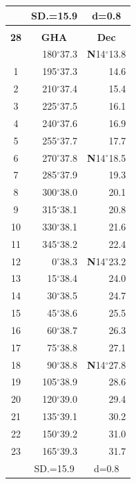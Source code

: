 \documentclass[10pt, a4paper]{report}
\begin{document}
\begin{scriptsize}
\begin{tabular*}{0.2\textwidth}[t]{@{\extracolsep{\fill}}|c|rr|}
\hline
\rule{0pt}{2.4ex} & \multicolumn{1}{c}{SD.=15.9} & \multicolumn{1}{c|}{d=0.8}\\
\hline
\multicolumn{1}{c}{}\\[-0.5ex]\hline
\multicolumn{1}{|c|}{\rule{0pt}{2.6ex}\textbf{28}} & \multicolumn{1}{c}{\textbf{GHA}} & \multicolumn{1}{c|}{\textbf{Dec}}\\
\hline\rule{0pt}{2.6ex}\noindent
0 & 180$^\circ$37.3 & \textbf{N}14$^\circ$13.8\\
1 & 195$^\circ$37.3 & 14.6\\
2 & 210$^\circ$37.4 & 15.4\\
3 & 225$^\circ$37.5 & \raisebox{0.24ex}{\boldmath$\cdot$~\boldmath$\cdot$~~}16.1\\
4 & 240$^\circ$37.6 & 16.9\\
5 & 255$^\circ$37.7 & 17.7\\[2Pt]
6 & 270$^\circ$37.8 & \textbf{N}14$^\circ$18.5\\
7 & 285$^\circ$37.9 & 19.3\\
8 & 300$^\circ$38.0 & 20.1\\
9 & 315$^\circ$38.1 & \raisebox{0.24ex}{\boldmath$\cdot$~\boldmath$\cdot$~~}20.8\\
10 & 330$^\circ$38.1 & 21.6\\
11 & 345$^\circ$38.2 & 22.4\\[2Pt]
12 & 0$^\circ$38.3 & \textbf{N}14$^\circ$23.2\\
13 & 15$^\circ$38.4 & 24.0\\
14 & 30$^\circ$38.5 & 24.7\\
15 & 45$^\circ$38.6 & \raisebox{0.24ex}{\boldmath$\cdot$~\boldmath$\cdot$~~}25.5\\
16 & 60$^\circ$38.7 & 26.3\\
17 & 75$^\circ$38.8 & 27.1\\[2Pt]
18 & 90$^\circ$38.8 & \textbf{N}14$^\circ$27.8\\
19 & 105$^\circ$38.9 & 28.6\\
20 & 120$^\circ$39.0 & 29.4\\
21 & 135$^\circ$39.1 & \raisebox{0.24ex}{\boldmath$\cdot$~\boldmath$\cdot$~~}30.2\\
22 & 150$^\circ$39.2 & 31.0\\
23 & 165$^\circ$39.3 & 31.7\\
\hline
\rule{0pt}{2.4ex} & \multicolumn{1}{c}{SD.=15.9} & \multicolumn{1}{c|}{d=0.8}\\
\hline
\end{tabular*}\noindent
\begin{tabular*}{0.2\textwidth}[t]{@{\extracolsep{\fill}}|c|rr|}

\end{tabular*}
\end{scriptsize}
\end{document}
